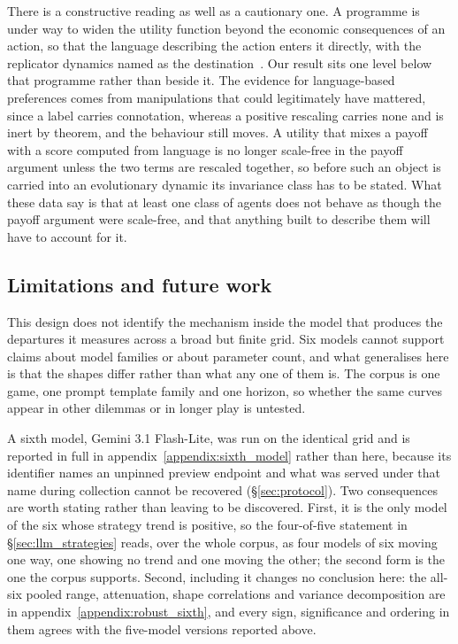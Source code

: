 \documentclass[openacc]{rsproca_new}
\begin{document}
There is a constructive reading as well as a cautionary one. A programme is
under way to widen the utility function beyond the economic consequences of an
action, so that the language describing the action enters it directly, with the
replicator dynamics named as the destination~\cite{capraro2024language}. Our
result sits one level below that programme rather than beside it. The evidence
for language-based preferences comes from manipulations that could legitimately
have mattered, since a label carries connotation, whereas a positive rescaling
carries none and is inert by theorem, and the behaviour still moves. A utility
that mixes a payoff with a score computed from language is no longer scale-free
in the payoff argument unless the two terms are rescaled together, so before
such an object is carried into an evolutionary dynamic its invariance class has
to be stated. What these data say is that at least one class of agents does not
behave as though the payoff argument were scale-free, and that anything built
to describe them will have to account for it.

\subsection{Limitations and future work}\label{sec:disc_limitations}

This design does not identify the mechanism inside the model that produces the
departures it measures across a broad but finite grid. Six models cannot
support claims about model families or about parameter count, and what
generalises here is that the shapes differ rather than what any one of them is.
The corpus is one game, one prompt template family and one horizon, so whether
the same curves appear in other dilemmas or in longer play is untested.

A sixth model, Gemini 3.1 Flash-Lite, was run on the identical grid and is
reported in full in appendix~\ref{appendix:sixth_model} rather than here,
because its identifier names an unpinned preview endpoint and what was served
under that name during collection cannot be recovered (\S\ref{sec:protocol}).
Two consequences are worth stating rather than leaving to be discovered. First,
it is the only model of the six whose strategy trend is positive, so the
four-of-five statement in \S\ref{sec:llm_strategies} reads, over the whole
corpus, as four models of six moving one way, one showing no trend and one
moving the other; the second form is the one the corpus supports. Second,
including it changes no conclusion here: the all-six pooled range, attenuation,
shape correlations and variance decomposition are in
appendix~\ref{appendix:robust_sixth}, and every sign, significance and ordering
in them agrees with the five-model versions reported above.
\end{document}

